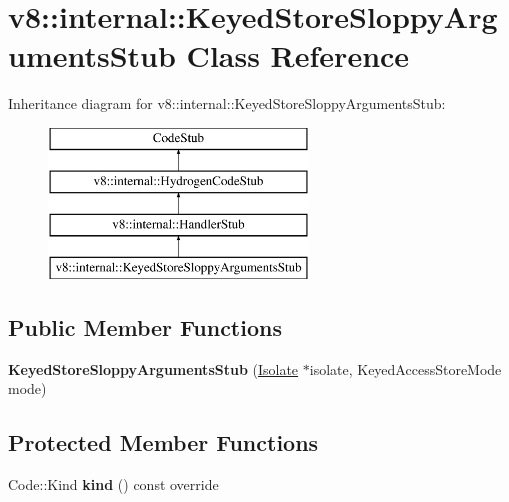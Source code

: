 \hypertarget{classv8_1_1internal_1_1_keyed_store_sloppy_arguments_stub}{}\section{v8\+:\+:internal\+:\+:Keyed\+Store\+Sloppy\+Arguments\+Stub Class Reference}
\label{classv8_1_1internal_1_1_keyed_store_sloppy_arguments_stub}
Inheritance diagram for v8\+:\+:internal\+:\+:Keyed\+Store\+Sloppy\+Arguments\+Stub\+:\begin{figure}[H]
\begin{center}
\leavevmode
\includegraphics[height=4.000000cm]{classv8_1_1internal_1_1_keyed_store_sloppy_arguments_stub}
\end{center}
\end{figure}
\subsection*{Public Member Functions}
\begin{DoxyCompactItemize}
\item 
{\bfseries Keyed\+Store\+Sloppy\+Arguments\+Stub} (\hyperlink{classv8_1_1internal_1_1_isolate}{Isolate} $\ast$isolate, Keyed\+Access\+Store\+Mode mode)\hypertarget{classv8_1_1internal_1_1_keyed_store_sloppy_arguments_stub_aacbe26e3ed1347eda30b828a87cb5966}{}\label{classv8_1_1internal_1_1_keyed_store_sloppy_arguments_stub_aacbe26e3ed1347eda30b828a87cb5966}

\end{DoxyCompactItemize}
\subsection*{Protected Member Functions}
\begin{DoxyCompactItemize}
\item 
Code\+::\+Kind {\bfseries kind} () const  override\hypertarget{classv8_1_1internal_1_1_keyed_store_sloppy_arguments_stub_a11d9b5f94725e3c77812f3859a825d98}{}\label{classv8_1_1internal_1_1_keyed_store_sloppy_arguments_stub_a11d9b5f94725e3c77812f3859a825d98}

\end{DoxyCompactItemize}
